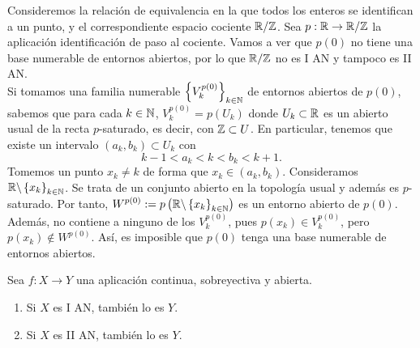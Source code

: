 \begin{eg}
Consideremos la relación de equivalencia en la que todos los enteros se identifican a un punto, y el correspondiente espacio cociente $\displaystyle \mathbb{R} / \mathbb{Z} $. Sea $\displaystyle p : \mathbb{R} \to \mathbb{R}/\mathbb{Z} $ la aplicación identificación de paso al cociente. Vamos a ver que $\displaystyle p\left(0\right) $ no tiene una base numerable de entornos abiertos, por lo que $\displaystyle \mathbb{R} / \mathbb{Z} $ no es I AN y tampoco es II AN. \\
\indent Si tomamos una familia numerable $\displaystyle \left\{ V_{k}^{p\left(0\right)}\right\} _{k \in \mathbb{N}} $ de entornos abiertos de $\displaystyle p\left(0\right) $, sabemos que para cada $\displaystyle k \in \mathbb{N}  $, $\displaystyle V_{k}^{p\left(0\right)}=p\left(U_{k}\right) $ donde $\displaystyle U_{k}\subset \mathbb{R} $ es un abierto usual de la recta $\displaystyle p $-saturado, es decir, con $\displaystyle \mathbb{Z} \subset U $. 
En particular, tenemos que existe un intervalo $\displaystyle \left(a_{k}, b_{k}\right)\subset U_{k} $ con 
\[k-1 < a_{k} < k < b_{k} < k+1 .\]
Tomemos un punto $\displaystyle x_{k}\neq k $ de forma que $\displaystyle x_{k}\in \left(a_{k}, b_{k}\right) $. Consideramos $\displaystyle \mathbb{R} \backslash \left\{ x_{k} \right\} _{k \in \mathbb{N}} $. Se trata de un conjunto abierto en la topología usual y además es $\displaystyle p $-saturado. Por tanto, $\displaystyle W^{p\left(0\right)}:= p\left(\mathbb{R} \backslash \left\{ x_{k}\right\} _{k \in \mathbb{N}}\right) $ es un entorno abierto de $\displaystyle p\left(0\right) $. 
Además, no contiene a ninguno de los $\displaystyle V^{p\left(0\right)}_{k} $, pues $\displaystyle p\left(x_{k}\right)\in V_{k}^{p\left(0\right)} $, pero $\displaystyle p\left(x_{k}\right)\not\in W^{p\left(0\right)} $. Así, es imposible que $\displaystyle p\left(0\right) $ tenga una base numerable de entornos abiertos. 
\end{eg}
\begin{prop}
Sea $\displaystyle f : X \to Y $ una aplicación continua, sobreyectiva y abierta.
\begin{enumerate}
\item Si $\displaystyle X $ es I AN, también lo es $\displaystyle Y $.
\item Si $\displaystyle X $ es II AN, también lo es $\displaystyle Y $.
\end{enumerate}
\end{prop}
